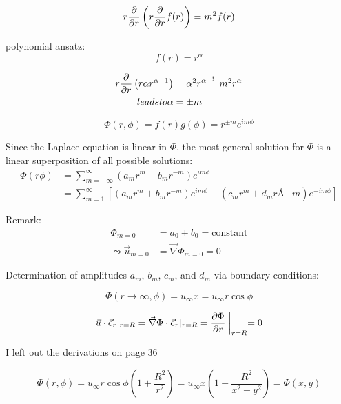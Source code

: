 \begin{equation}
r\frac{\partial }{\partial r}\left(r\frac{\partial }{\partial r}f(r)\right) = m^2f(r)
\end{equation}

polynomial ansatz:
\begin{equation}
f(r) = r^\alpha
\end{equation}

\begin{align}
r\frac{\partial }{\partial r}\left(r\alpha r^{\alpha-1}\right) &= \alpha^2 r^\alpha \overset{!}{=} m^2 r^\alpha\\
leadsto
\alpha &= \pm m
\end{align}

\begin{equation}
\Phi(r,\phi) = f(r)g(\phi) = r^{\pm m}e^{im\phi}
\end{equation}

Since the Laplace equation is linear in $\Phi$, the most general solution for $\Phi$ is a linear superposition of all possible solutions:
\begin{align}
\Phi(r\phi) &= \sum_{m=-\infty}^\infty \left(a_m r^m + b_m r^{-m}\right) e^{im\phi} \\
&= \sum_{m=1}^{\infty} \left[ \left(a_m r^m + b_m r^{-m}\right)e^{im\phi} + \left(c_m r^m + d_m rÅ {-m}\right) e^{-im\phi}\right]
\end{align}

Remark:
\begin{align}
\Phi_{m=0} &= a_0+b_0 = \mathrm{constant} \\
\leadsto
\vec{u}_{m=0} &= \vec{\nabla}\Phi_{m=0}=0
\end{align}

Determination of amplitudes $a_m$, $b_m$, $c_m$, and $d_m$ via boundary conditions:

\begin{equation}
\Phi(r\rightarrow\infty, \phi) = u_\infty x = u_\infty r\cos\phi
\end{equation}

\begin{equation}
\vec{u}\cdot \vec{e}_r |_{r=R} = \vec{\nabla}\Phi\cdot\vec{e}_r|_{r=R} = \frac{\partial \Phi}{\partial r}\biggm\vert_{r=R}=0
\end{equation}

\begin{shaded}
I left out the derivations on page 36
\end{shaded}

\begin{equation}
\Phi(r,\phi) = u_\infty r \cos \phi \left(1+\frac{R^2}{r^2}\right) = u_\infty x \left(1+\frac{R^2}{x^2+y^2}\right) = \Phi(x,y)
\end{equation}
